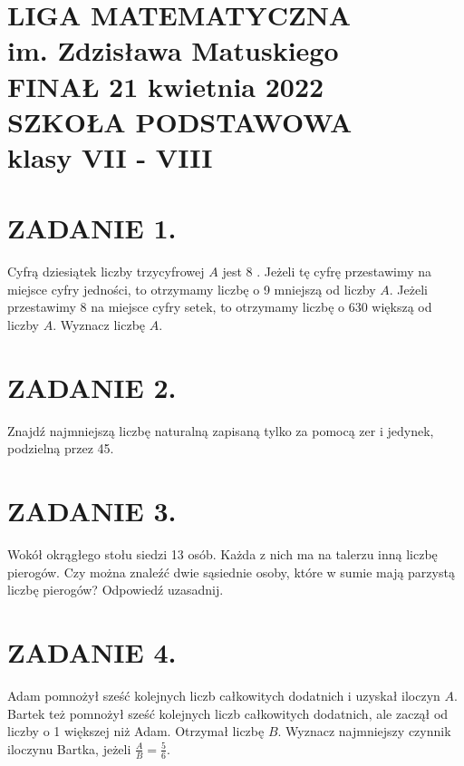 \documentclass[10pt]{article}
\begin{document}
\section*{LIGA MATEMATYCZNA \\
 im. Zdzisława Matuskiego \\
 FINAŁ 21 kwietnia 2022 \\
 SZKOŁA PODSTAWOWA \\
 klasy VII - VIII}
\section*{ZADANIE 1.}
Cyfrą dziesiątek liczby trzycyfrowej \(A\) jest 8 . Jeżeli tę cyfrę przestawimy na miejsce cyfry jedności, to otrzymamy liczbę o 9 mniejszą od liczby \(A\). Jeżeli przestawimy 8 na miejsce cyfry setek, to otrzymamy liczbę o 630 większą od liczby \(A\). Wyznacz liczbę \(A\).

\section*{ZADANIE 2.}
Znajdź najmniejszą liczbę naturalną zapisaną tylko za pomocą zer i jedynek, podzielną przez 45.

\section*{ZADANIE 3.}
Wokół okrągłego stołu siedzi 13 osób. Każda z nich ma na talerzu inną liczbę pierogów. Czy można znaleźć dwie sąsiednie osoby, które w sumie mają parzystą liczbę pierogów? Odpowiedź uzasadnij.

\section*{ZADANIE 4.}
Adam pomnożył sześć kolejnych liczb całkowitych dodatnich i uzyskał iloczyn \(A\). Bartek też pomnożył sześć kolejnych liczb całkowitych dodatnich, ale zaczął od liczby o 1 większej niż Adam. Otrzymał liczbę \(B\). Wyznacz najmniejszy czynnik iloczynu Bartka, jeżeli \(\frac{A}{B}=\frac{5}{6}\).
\end{document}
